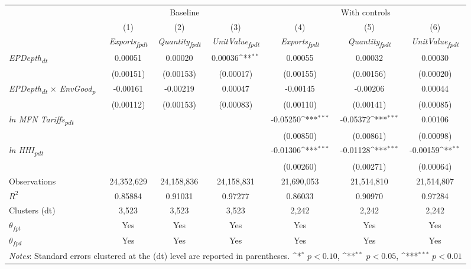 {
\def\sym#1{\ifmmode^{#1}\else\(^{#1}\)\fi}
\begin{tabular}{l*{6}{c}}
\toprule
&\multicolumn{3}{c}{Baseline}&\multicolumn{3}{c}{With controls}\\\cmidrule(lr){2-4}\cmidrule(lr){5-7}
&(1)&(2)&(3)&(4)&(5)&(6)\\
&\textit{Exports\textsubscript{fpdt}}&\textit{Quantity\textsubscript{fpdt}}&\textit{UnitValue\textsubscript{fpdt}}&\textit{Exports\textsubscript{fpdt}}&\textit{Quantity\textsubscript{fpdt}}&\textit{UnitValue\textsubscript{fpdt}}\\
\midrule
\textit{EPDepth\textsubscript{dt}} & 0.00051 & 0.00020 & 0.00036\sym{**} & 0.00055 & 0.00032 & 0.00030\\
 & (0.00151) & (0.00153) & (0.00017) & (0.00155) & (0.00156) & (0.00020)\\
\addlinespace
\textit{EPDepth\textsubscript{dt} $\times$ EnvGood\textsubscript{p}} & -0.00161 & -0.00219 & 0.00047 & -0.00145 & -0.00206 & 0.00044\\
 & (0.00112) & (0.00153) & (0.00083) & (0.00110) & (0.00141) & (0.00085)\\
\addlinespace
\textit{ln MFN Tariffs\textsubscript{pdt}} &  &  &  & -0.05250\sym{***} & -0.05372\sym{***} & 0.00106\\
 &  &  &  & (0.00850) & (0.00861) & (0.00098)\\
\addlinespace
\textit{ln HHI\textsubscript{pdt}} &  &  &  & -0.01306\sym{***} & -0.01128\sym{***} & -0.00159\sym{**}\\
 &  &  &  & (0.00260) & (0.00271) & (0.00064)\\
\midrule
Observations & 24,352,629 & 24,158,836 & 24,158,831 & 21,690,053 & 21,514,810 & 21,514,807\\
$R^{2}$ & 0.85884 & 0.91031 & 0.97277 & 0.86033 & 0.90970 & 0.97284\\
Clusters (dt) & 3,523 & 3,523 & 3,523 & 2,242 & 2,242 & 2,242\\
$\theta_{fpt}$ & Yes & Yes & Yes & Yes & Yes & Yes\\
$\theta_{fpd}$ & Yes & Yes & Yes & Yes & Yes & Yes\\
\bottomrule
\multicolumn{7}{l}{\footnotesize \textit{Notes}: Standard errors clustered at the (dt) level are reported in parentheses. \sym{*} \(p<0.10\), \sym{**} \(p<0.05\), \sym{***} \(p<0.01\)}\\
\end{tabular}
}
